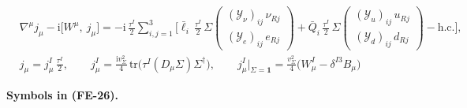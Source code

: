 \documentclass[
  10pt,
]{article}
\begin{document}
\[
\begin{aligned}
&\nabla^\mu j_\mu - \mathrm{i}\big[W^\mu,\ j_\mu\big] = -\mathrm{i}\,\frac{\tau^I}{2}\sum_{i,j=1}^{3}\Big[
 \bar\ell_i\,\frac{\tau^I}{2}\,\Sigma\begin{pmatrix}(\mathcal{Y}_\nu)_{ij}\,\nu_{Rj}\\ (
 \mathcal{Y}_e)_{ij}\,e_{Rj}\end{pmatrix}
 + \bar Q_i\,\frac{\tau^I}{2}\,\Sigma\begin{pmatrix}(\mathcal{Y}_u)_{ij}\,u_{Rj}\\ (
 \mathcal{Y}_d)_{ij}\,d_{Rj}\end{pmatrix}
 - \text{h.c.}\Big],\\
&j_\mu = j^I_\mu\,\frac{\tau^I}{2},\qquad j^I_\mu =
 \frac{\mathrm{i}v_\Sigma^2}{4}\,\mathrm{tr}\big(\tau^I(D_\mu\Sigma)\Sigma^\dagger\big),
 \qquad j^I_\mu\big\vert_{\Sigma = \mathbf{1}} = \frac{v_\Sigma^2}{4}\big(W^I_\mu - \delta^{I3}B_\mu\big)
\end{aligned} \tag{FE-26}
\]

\textbf{Symbols in (FE-26).}
\end{document}
